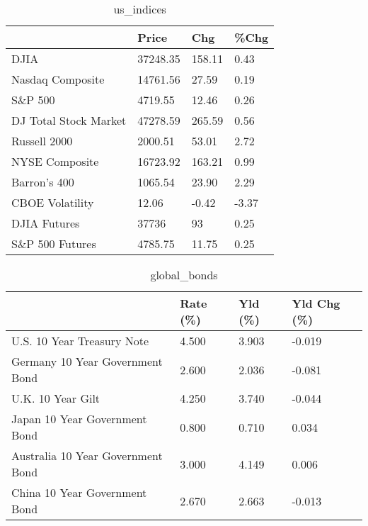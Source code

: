 \documentclass{article}%
\begin{document}
%


\begin{table}[htbp]%
\caption{us\_indices}%
\centering%
\begin{adjustbox}{width=1\textwidth}%
\begin{tabular}{llll}
\toprule
                      &    Price &    Chg &  \%Chg \\
\midrule
                 DJIA & 37248.35 & 158.11 &  0.43 \\
     Nasdaq Composite & 14761.56 &  27.59 &  0.19 \\
              S\&P 500 &  4719.55 &  12.46 &  0.26 \\
DJ Total Stock Market & 47278.59 & 265.59 &  0.56 \\
         Russell 2000 &  2000.51 &  53.01 &  2.72 \\
       NYSE Composite & 16723.92 & 163.21 &  0.99 \\
         Barron's 400 &  1065.54 &  23.90 &  2.29 \\
      CBOE Volatility &    12.06 &  -0.42 & -3.37 \\
         DJIA Futures &    37736 &     93 &  0.25 \\
      S\&P 500 Futures &  4785.75 &  11.75 &  0.25 \\
\bottomrule
\end{tabular}
%
\end{adjustbox}%
\end{table}

%


\begin{table}[htbp]%
\caption{global\_bonds}%
\centering%
\begin{adjustbox}{width=1\textwidth}%
\begin{tabular}{llll}
\toprule
                                  & Rate (\%) & Yld (\%) & Yld Chg (\%) \\
\midrule
       U.S. 10 Year Treasury Note &    4.500 &   3.903 &      -0.019 \\
  Germany 10 Year Government Bond &    2.600 &   2.036 &      -0.081 \\
                U.K. 10 Year Gilt &    4.250 &   3.740 &      -0.044 \\
    Japan 10 Year Government Bond &    0.800 &   0.710 &       0.034 \\
Australia 10 Year Government Bond &    3.000 &   4.149 &       0.006 \\
    China 10 Year Government Bond &    2.670 &   2.663 &      -0.013 \\
\bottomrule
\end{tabular}
%
\end{adjustbox}%
\end{table}
\end{document}
